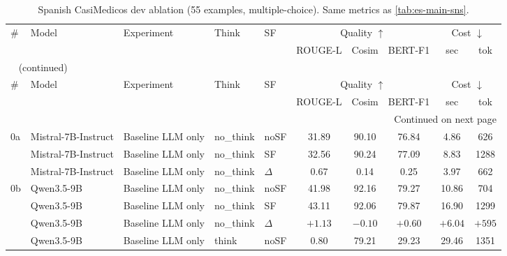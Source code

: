 \begin{scriptsize}
\setlength{\tabcolsep}{3pt}
\setlength{\LTcapwidth}{\linewidth}
\begin{longtable}{l l l l l c c c c c}
\caption[Spanish CasiMédicos-Arg dev ablation]{Spanish CasiMedicos dev ablation (55 examples, multiple-choice). Same metrics as \autoref{tab:es-main-sns}.} \label{tab:es-main-casi} \\
\toprule
\# & Model & Experiment & Think & SF & \multicolumn{3}{c}{Quality $\uparrow$} & \multicolumn{2}{c}{Cost $\downarrow$} \\
\cmidrule(lr){6-8}\cmidrule(lr){9-10}
\multicolumn{1}{l}{} & \multicolumn{1}{l}{} & \multicolumn{1}{l}{} & \multicolumn{1}{l}{} & \multicolumn{1}{l}{} & \multicolumn{1}{c}{ROUGE-L} & \multicolumn{1}{c}{Cosim} & \multicolumn{1}{c}{BERT-F1} & \multicolumn{1}{c}{sec} & \multicolumn{1}{c}{tok} \\
\midrule
\endfirsthead
\multicolumn{10}{l}{\tablename\ \thetable{} (continued)} \\
\toprule
\# & Model & Experiment & Think & SF & \multicolumn{3}{c}{Quality $\uparrow$} & \multicolumn{2}{c}{Cost $\downarrow$} \\
\cmidrule(lr){6-8}\cmidrule(lr){9-10}
\multicolumn{1}{l}{} & \multicolumn{1}{l}{} & \multicolumn{1}{l}{} & \multicolumn{1}{l}{} & \multicolumn{1}{l}{} & \multicolumn{1}{c}{ROUGE-L} & \multicolumn{1}{c}{Cosim} & \multicolumn{1}{c}{BERT-F1} & \multicolumn{1}{c}{sec} & \multicolumn{1}{c}{tok} \\
\midrule
\endhead
\midrule
\multicolumn{10}{r}{Continued on next page} \\
\endfoot
\bottomrule
\endlastfoot
0a & Mistral-7B-Instruct & Baseline LLM only & no\_think & noSF & 31.89 & 90.10 & 76.84 & 4.86 & 626 \\
 & Mistral-7B-Instruct & Baseline LLM only & no\_think & SF & 32.56 & 90.24 & 77.09 & 8.83 & 1288 \\
 & Mistral-7B-Instruct & Baseline LLM only & no\_think & $\Delta$ & 0.67 & 0.14 & 0.25 & 3.97 & 662 \\
0b & Qwen3.5-9B & Baseline LLM only & no\_think & noSF & 41.98 & 92.16 & 79.27 & 10.86 & 704 \\
 & Qwen3.5-9B & Baseline LLM only & no\_think & SF & 43.11 & 92.06 & 79.87 & 16.90 & 1299 \\
 & Qwen3.5-9B & Baseline LLM only & no\_think & $\Delta$ & $+1.13$ & $-0.10$ & $+0.60$ & $+6.04$ & $+595$ \\
 & Qwen3.5-9B & Baseline LLM only & think & noSF & 0.80 & 79.21 & 29.23 & 29.46 & 1351 \\

\end{longtable}
\end{scriptsize}
